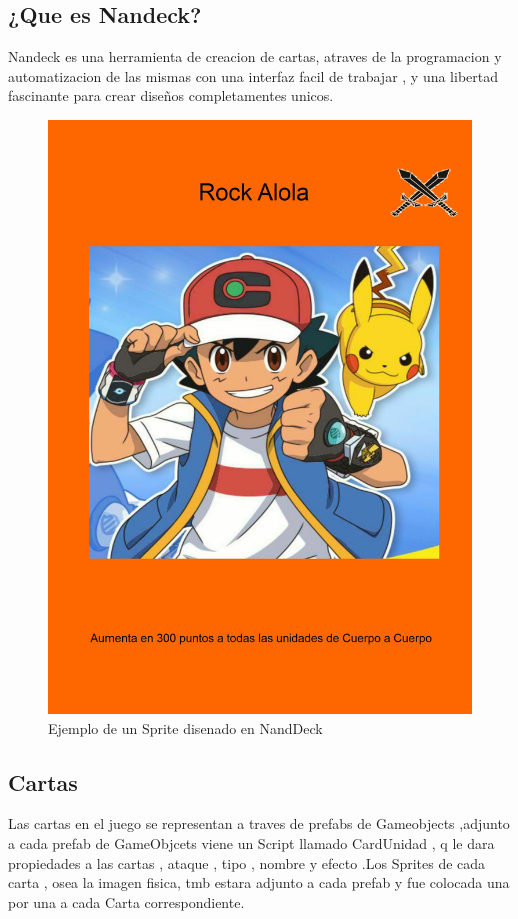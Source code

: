 \documentclass{article}
\begin{document}
\subsection{¿Que es Nandeck?}
Nandeck es una herramienta de creacion de cartas, atraves de la programacion y automatizacion de las mismas con una interfaz facil de trabajar , y una libertad fascinante para crear diseños completamentes unicos.
\begin{figure}
\centering
\includegraphics[width =1\textwidth]
{Aumento3}
\caption{Ejemplo de un Sprite disenado en NandDeck}
\label{fig : a}
\end{figure}
\newpage
\subsection{Cartas}
Las cartas en el juego se representan a traves de prefabs de Gameobjects ,adjunto a cada prefab de GameObjcets viene un Script llamado CardUnidad , q le dara propiedades a las cartas  , ataque , tipo , nombre y efecto .Los Sprites de cada carta , osea la imagen fisica, tmb estara adjunto a cada prefab y fue colocada una por una a cada Carta correspondiente.
\end{document}
